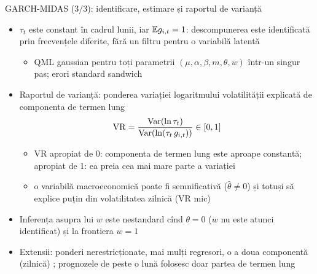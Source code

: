 \begin{frame}{GARCH-MIDAS (3/3): identificare, estimare și raportul de varianță}
\itemsize{\small}
\begin{itemize}
    \item $\tau_t$ este constant în cadrul lunii, iar $\mathbb{E} g_{i,t} = 1$: descompunerea este identificată prin frecvențele diferite, fără un filtru pentru o variabilă latentă
    \begin{itemize}
        \item QML gaussian pentru toți parametrii $(\mu, \alpha, \beta, m, \theta, w)$ într-un singur pas; erori standard sandwich
    \end{itemize}
    \item Raportul de varianță: ponderea variației logaritmului volatilității explicată de componenta de termen lung
    \[ \mathrm{VR} = \frac{\text{Var}(\ln\tau_t)}{\text{Var}(\ln(\tau_t\,g_{i,t}))} \in [0, 1] \]
    \begin{itemize}
        \item VR apropiat de 0: componenta de termen lung este aproape constantă; apropiat de 1: ea preia cea mai mare parte a variației
        \item o variabilă macroeconomică poate fi semnificativă ($\hat\theta \ne 0$) și totuși să explice puțin din volatilitatea zilnică (VR mic)
    \end{itemize}
    \item Inferența asupra lui $w$ este nestandard cînd $\theta = 0$ ($w$ nu este atunci identificat) și la frontiera $w = 1$
    \item Extensii: ponderi nerestricționate, mai mulți regresori, o a doua componentă (zilnică) ; prognozele de peste o lună folosesc doar partea de termen lung
\end{itemize}
\end{frame}

